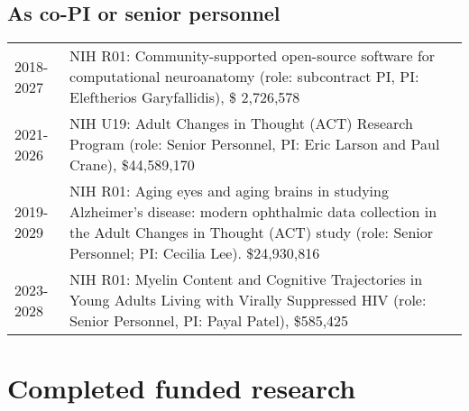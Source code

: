 \documentclass[11pt,fullpage]{article}
\begin{document}
\subsection*{As co-PI or senior personnel}
\begin{tabular}{p{}p{}}
2018-2027 & NIH R01: Community-supported open-source software for computational neuroanatomy (role: subcontract PI, PI: Eleftherios Garyfallidis), \$ 2,726,578 \\
2021-2026 & NIH U19: Adult Changes in Thought (ACT) Research Program (role: Senior Personnel, PI: Eric Larson and Paul Crane), \$44,589,170\\
2019-2029 & NIH R01: Aging eyes and aging brains in studying Alzheimer's disease: modern ophthalmic data collection in the Adult Changes in Thought (ACT) study (role: Senior Personnel; PI: Cecilia Lee). \$24,930,816  \\
2023-2028 & NIH R01: Myelin Content and Cognitive Trajectories in Young Adults Living with Virally Suppressed HIV (role: Senior Personnel, PI: Payal Patel), \$585,425\\

\end{tabular}
\section*{Completed funded research}
\end{document}
